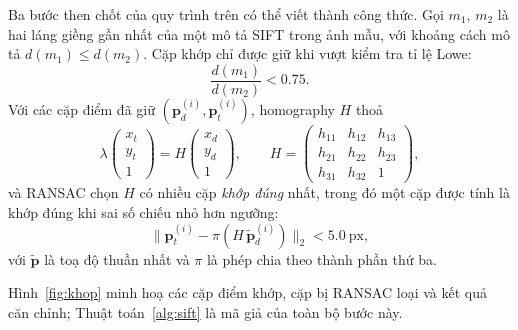 \documentclass[11pt,a4paper]{article}
\newcommand{\hinhref}[1]{Hình~\ref{fig:#1}}
\newcommand{\thuattoanref}[1]{Thuật toán~\ref{alg:#1}}
\begin{document}
Ba bước then chốt của quy trình trên có thể viết thành công thức. Gọi $m_1$, $m_2$ là hai láng giềng gần nhất của một mô tả SIFT trong ảnh mẫu, với khoảng cách mô tả $d(m_1)\le d(m_2)$. Cặp khớp chỉ được giữ khi vượt kiểm tra tỉ lệ Lowe:
\begin{equation}\label{eq:lowe}
\frac{d(m_1)}{d(m_2)} < 0.75 .
\end{equation}
Với các cặp điểm đã giữ $(\mathbf{p}_d^{(i)},\mathbf{p}_t^{(i)})$, homography $H$ thoả
\begin{equation}\label{eq:homo}
\lambda\begin{pmatrix}x_t\\ y_t\\ 1\end{pmatrix}=H\begin{pmatrix}x_d\\ y_d\\ 1\end{pmatrix},
\qquad H=\begin{pmatrix}h_{11}&h_{12}&h_{13}\\ h_{21}&h_{22}&h_{23}\\ h_{31}&h_{32}&1\end{pmatrix},
\end{equation}
và RANSAC chọn $H$ có nhiều cặp \emph{khớp đúng} nhất, trong đó một cặp được tính là khớp đúng khi sai số chiếu nhỏ hơn ngưỡng:
\begin{equation}\label{eq:ransac}
\bigl\lVert \mathbf{p}_t^{(i)}-\pi\!\left(H\,\tilde{\mathbf{p}}_d^{(i)}\right)\bigr\rVert_2 < 5.0\ \text{px},
\end{equation}
với $\tilde{\mathbf{p}}$ là toạ độ thuần nhất và $\pi$ là phép chia theo thành phần thứ ba.

\hinhref{khop} minh hoạ các cặp điểm khớp, cặp bị RANSAC loại và kết quả căn chỉnh; \thuattoanref{sift} là mã giả của toàn bộ bước này.
\end{document}
